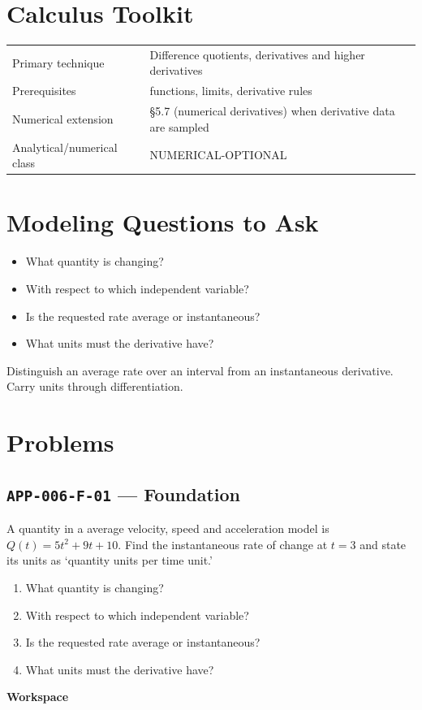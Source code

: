 \documentclass[11pt]{book}
\newcommand{\pid}[1]{\texttt{#1}}
\newcommand{\workspace}{\par\vspace{0.7in}\hrulefill\par\vspace{0.55in}\hrulefill\par}
\begin{document}
\section*{Calculus Toolkit}
\begin{tabularx}{\textwidth}{@{}lX@{}}\toprule
Primary technique & Difference quotients, derivatives and higher derivatives \\
Prerequisites & functions, limits, derivative rules \\
Numerical extension & §5.7 (numerical derivatives) when derivative data are sampled \\
Analytical/numerical class & NUMERICAL-OPTIONAL \\
\bottomrule\end{tabularx}
\section*{Modeling Questions to Ask}\begin{itemize}
\item What quantity is changing?
\item With respect to which independent variable?
\item Is the requested rate average or instantaneous?
\item What units must the derivative have?
\end{itemize}
\begin{errorbox}Distinguish an average rate over an interval from an instantaneous derivative. Carry units through differentiation.\end{errorbox}
\section*{Problems}
\subsection*{\pid{APP-006-F-01} — Foundation}
\begin{problembox}
A quantity in a average velocity, speed and acceleration model is $Q(t)=5t^2+9t+10$. Find the instantaneous rate of change at $t=3$ and state its units as ‘quantity units per time unit.’
\end{problembox}
\begin{promptbox}\begin{enumerate}
\item What quantity is changing?
\item With respect to which independent variable?
\item Is the requested rate average or instantaneous?
\item What units must the derivative have?
\end{enumerate}\end{promptbox}
\textbf{Workspace}\workspace
{}
\end{document}
